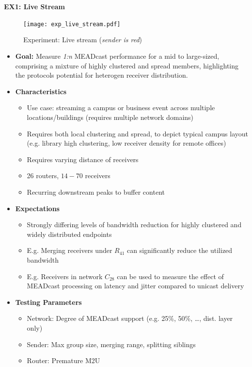 \paragraph{EX1: Live Stream} %
\label{par:impl EX1: Live Stream}

\begin{figure}[!htbp]
    \begin{center}
        \texttt{[image: exp\_live\_stream.pdf]}
    \end{center}
    \caption{Experiment: Live stream (\textit{sender is red})}
    \label{fig:exp_live_stream}
\end{figure}

\begin{itemize}\itemsep0em
    \item \textbf{Goal:} Measure \textit{1:n} MEADcast performance for a
        mid to large-sized, comprising a mixture of highly clustered and spread
        members, highlighting the protocols potential for heterogen receiver
        distribution.
    \item[] \textbf{Characteristics}
    \begin{itemize}\itemsep0em
        \item Use case: streaming a campus or business event across multiple
            locations/buildings (requires multiple network domains)
        \item Requires both local clustering and spread, to depict typical
            campus layout (e.g. library high clustering, low receiver density
            for remote offices)
        \item Requires varying distance of receivers
        \item 26 routers, $14-70$ receivers
        \item Recurring downstream peaks to buffer content
            \cite{cartesian_us_bw}
    \end{itemize}
    \item[] \textbf{Expectations}
    \begin{itemize}\itemsep0em
        \item Strongly differing levels of bandwidth reduction for highly
            clustered and widely distributed endpoints
        \item E.g. Merging receivers under $R_{41}$ can significantly reduce
            the utilized bandwidth 
        \item E.g. Receivers in network $C_{28}$ can be used to measure
            the effect of MEADcast processing on latency and jitter compared to
            unicast delivery
    \end{itemize}
    \item[] \textbf{Testing Parameters}
    \begin{itemize}\itemsep0em
            \item Network: Degree of MEADcast support (e.g. 25\%, 50\%, \dots,
                dist. layer only)
        \item Sender: Max group size, merging range, splitting siblings
        \item Router: Premature M2U
    \end{itemize}
\end{itemize}
